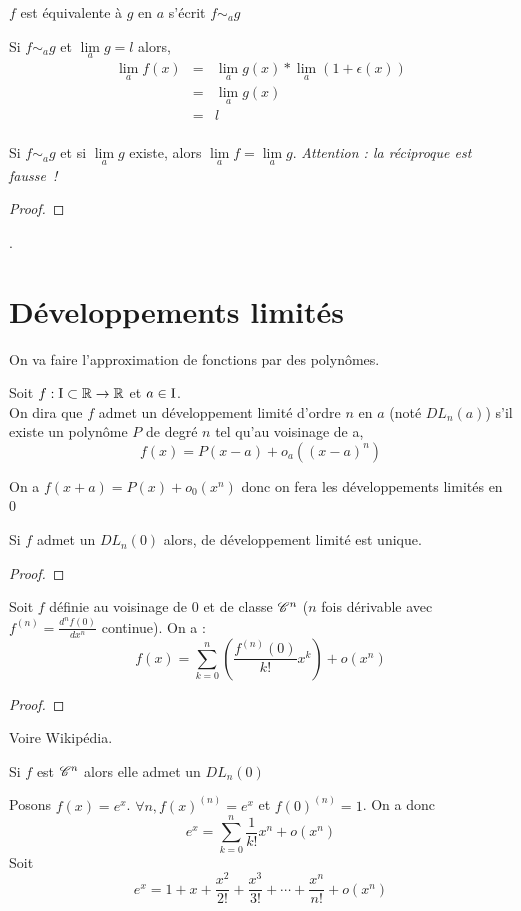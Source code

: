 \nota
$f$ est équivalente à $g$ en $a$ s'écrit $f\sim_{a}g$

\rem
Si $f\sim_{a}g$ et $\lim\limits_ag=l$ alors,
\begin{eqnarray*}
		\lim\limits_a f(x) &=& \lim\limits_a g(x) *\lim\limits_a(1+\epsilon(x))\\
		& = & \lim\limits_a g(x)\\
		&=&l\\
\end{eqnarray*}

\propo{}
Si $f\sim_ag$ et si $\lim\limits_ag$ existe, alors $\lim\limits_af=\lim\limits_ag$. \emph{Attention : la réciproque est fausse~!}

\begin{proof}\end{proof}{}
\expl.

\section{Développements limités}
\idee
On va faire l'approximation de fonctions par des polynômes.

Soit $f:\text{I} \subset \mathbb{R} \to \mathbb{R}$ et $a\in \text{I}$.\\
On dira que $f$ admet un développement limité d'ordre $n$ en $a$ (noté $DL_n(a)$) s'il existe un polynôme $P$ de degré $n$ tel qu'au voisinage de a,
$$f(x) = P(x-a) + o_a((x-a)^n)$$

\rem
On a $f(x+a) = P(x) + o_0(x^n)$ donc on fera les développements limités en 0

\prop{}
Si $f$ admet un $DL_n(0)$ alors, de développement limité est unique.

\begin{proof}\end{proof}
\expl

Soit $f$ définie au voisinage de 0 et de classe $\mathscr{C}^n$ ($n$ fois dérivable avec $f^{(n)}=\frac{d^nf(0)}{dx^n}$ continue). On a :
$$f(x)=\sum_{k=0}^n{\left(\frac{f^{(n)}(0)}{k!}x^k\right)}+o(x^n)$$

\begin{proof}\end{proof}
Voire Wikipédia.

\coro
Si $f$ est $\mathscr{C}^n$ alors elle admet un $DL_n(0)$

\expl
Posons $f(x)=e^x$. $\forall n,f(x)^{(n)} = e^x$ et $f(0)^{(n)} = 1$. On a donc
$$e^x = \sum_{k=0}^n{\frac{1}{k!}x^n}+o(x^n)$$
Soit
\[e^x=1+x+\frac{x^2}{2!}+\frac{x^3}{3!}+\cdots+\frac{x^n}{n!}+o(x^n)\]

